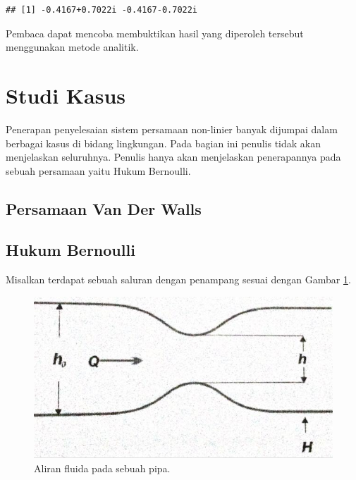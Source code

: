 \documentclass[]{book}
\theoremstyle{definition}
\theoremstyle{definition}
\theoremstyle{definition}
\theoremstyle{remark}
\begin{document}
\begin{verbatim}
## [1] -0.4167+0.7022i -0.4167-0.7022i
\end{verbatim}

Pembaca dapat mencoba membuktikan hasil yang diperoleh tersebut menggunakan metode analitik.

\hypertarget{studi-kasus}{%
\section{Studi Kasus}\label{studi-kasus}}

Penerapan penyelesaian sistem persamaan non-linier banyak dijumpai dalam berbagai kasus di bidang lingkungan. Pada bagian ini penulis tidak akan menjelaskan seluruhnya. Penulis hanya akan menjelaskan penerapannya pada sebuah persamaan yaitu Hukum Bernoulli.

\hypertarget{persamaan-van-der-walls}{%
\subsection{Persamaan Van Der Walls}\label{persamaan-van-der-walls}}

\hypertarget{hukum-bernoulli}{%
\subsection{Hukum Bernoulli}\label{hukum-bernoulli}}

Misalkan terdapat sebuah saluran dengan penampang sesuai dengan Gambar \ref{fig:bernoulli}.

\begin{figure}

{\centering \includegraphics[width=0.8\linewidth]{./images/bernoulli} 

}

\caption{Aliran fluida pada sebuah pipa.}\label{fig:bernoulli}
\end{figure}
\end{document}

